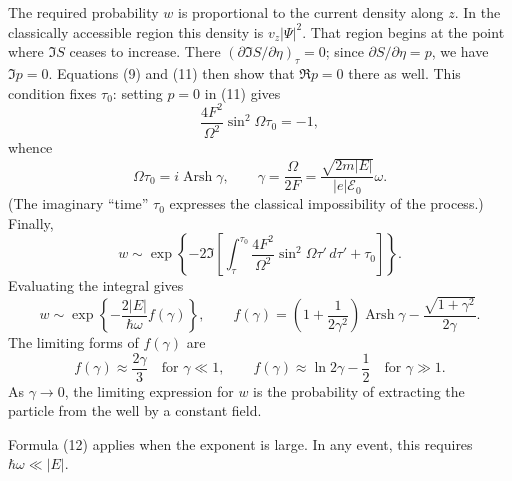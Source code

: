 The required probability $w$ is proportional to the current density along $z$. In the classically accessible region this density is $v_z|\Psi|^2$. That region begins at the point where $\Im S$ ceases to increase. There $(\partial\Im S/\partial\eta)_\tau=0$; since $\partial S/\partial\eta=p$, we have $\Im p=0$. Equations (9) and (11) then show that $\Re p=0$ there as well. This condition fixes $\tau_0$: setting $p=0$ in (11) gives
\[
 \frac{4F^2}{\Omega^2}\sin^2\Omega\tau_0=-1,
\]
whence
\[
 \Omega\tau_0=i\operatorname{Arsh}\gamma,\qquad
 \gamma=\frac\Omega{2F}=\frac{\sqrt{2m|E|}}{|e|\mathcal E_0}\omega.
\]
(The imaginary ``time'' $\tau_0$ expresses the classical impossibility of the process.) Finally,
\[
 w\sim\exp\left\{-2\Im\left[\int_\tau^{\tau_0}\frac{4F^2}{\Omega^2}\sin^2\Omega\tau'\,d\tau'+\tau_0\right]\right\}.
\]
Evaluating the integral gives
\begin{equation}
 w\sim\exp\left\{-\frac{2|E|}{\hbar\omega}f(\gamma)\right\},\qquad
 f(\gamma)=\left(1+\frac1{2\gamma^2}\right)\operatorname{Arsh}\gamma-\frac{\sqrt{1+\gamma^2}}{2\gamma}.
 \tag{12}
\end{equation}
The limiting forms of $f(\gamma)$ are
\[
 f(\gamma)\approx\frac{2\gamma}{3}\quad\text{for }\gamma\ll1,\qquad
 f(\gamma)\approx\ln2\gamma-\frac12\quad\text{for }\gamma\gg1.
\]
As $\gamma\to0$, the limiting expression for $w$ is the probability of extracting the particle from the well by a constant field.

Formula (12) applies when the exponent is large. In any event, this requires $\hbar\omega\ll|E|$.
